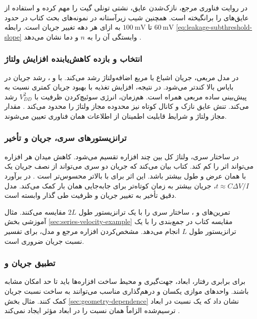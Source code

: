 در روایت فناوری مرجع، نازک‌شدن عایق، نشتی تونلی گیت را مهم کرده
و استفاده از عایق‌های  را برانگیخته است. همچنین شیب
زیرآستانه در نمونه‌های بحث کتاب در حدود
\(\qty{60}{\milli\volt}\) تا \(\qty{100}{\milli\volt}\) به ازای هر
دهه تغییر جریان است. رابطه \eqref{eq:leakage-subthreshold-slope}
وابستگی آن را به \(n\) و دما نشان می‌دهد
\cite[صفحات ۸۲ و ۸۷]{weste}.

\subsubsection*{انتخاب  و بازده کاهش‌یابنده افزایش ولتاژ}
در مدل مربعی، جریان اشباع با مربع اضافه‌ولتاژ رشد می‌کند. با
 و ، رشد جریان
در بایاس بالا کندتر می‌شود. در نتیجه، افزایش تغذیه با بهبود جریان
کمتری نسبت به پیش‌بینی ساده مربعی همراه است. هم‌زمان، انرژی
سوئیچ‌کردن ظرفیت با \(V_{DD}^2\) رشد می‌کند. تنش عایق نازک و
کانال کوتاه نیز محدوده مجاز ولتاژ را محدود می‌کند
\cite[صفحه ۸۷]{weste}. مقدار مجاز ولتاژ و شرایط قابلیت اطمینان از
اطلاعات همان فناوری تعیین می‌شوند.

\subsubsection*{ترانزیستورهای سری، جریان و تأخیر}
در ساختار سری، ولتاژ کل بین چند افزاره تقسیم می‌شود. کاهش میدان
هر افزاره می‌تواند اثر  را کم کند. کتاب
بیان می‌کند که جریان دو  سری می‌تواند از نصف جریان یک
 با همان عرض و طول بیشتر باشد. این اثر برای 
با  بالاتر محسوس‌تر است
\cite[صفحه ۸۷]{weste}. در برآورد
\(t\approx C\Delta V/I\)، جریان بیشتر به زمان کوتاه‌تر برای
جابه‌جایی همان بار کمک می‌کند. مدل دقیق تأخیر به تغییر جریان و
ظرفیت طی گذار وابسته است.

تمرین‌های  و ، ساختار سری را با یک ترانزیستور طول \(2L\)
مقایسه می‌کنند. مثال آموزشی بخش \ref{sec:series-velocity-example}
مقایسه کتاب در جمع‌بندی را با یک ترانزیستور طول \(L\) انجام می‌دهد.
مشخص‌کردن افزاره مرجع و مدل، برای تفسیر نسبت جریان ضروری است.

\subsubsection*{تطبیق جریان و }
برای برابری رفتار، ابعاد، جهت‌گیری و محیط ساخت افزاره‌ها باید تا
حد امکان مشابه باشند. واحدهای موازی یکسان و درهم‌گذاری مناسب
می‌توانند به ساخت نسبت جریان کمک کنند. مثال بخش
\ref{sec:geometry-dependence} نشان داد که یک نسبت در ابعاد
ترسیم‌شده الزاماً همان نسبت را در ابعاد مؤثر ایجاد نمی‌کند
\cite[صفحات ۸۶ و ۸۷]{weste}.

